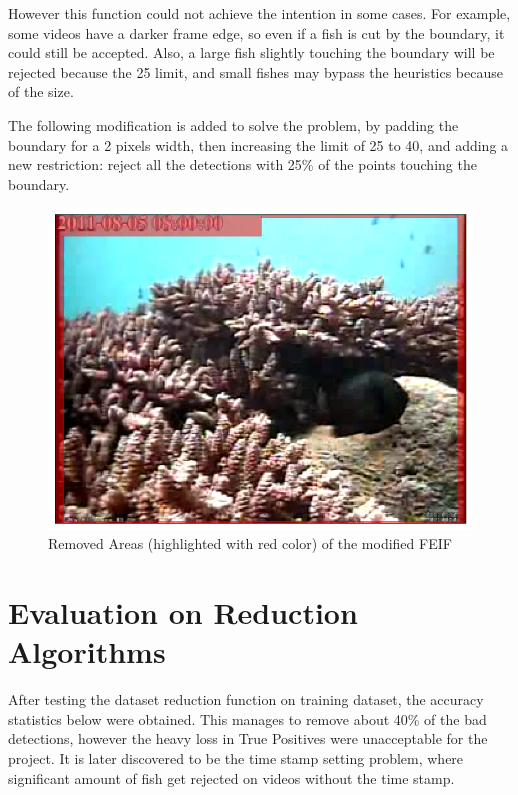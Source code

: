 \documentclass[bsc,logo,twoside,fullspacing,parskip]{infthesis}
\begin{document}
However this function could not achieve the intention in some cases. 
For example, some videos have a darker frame edge, so even if a fish is cut by the boundary, it could still be accepted. 
Also, a large fish slightly touching the boundary will be rejected because the 25 limit, and small fishes may bypass the heuristics because of the size.

The following modification is added to solve the problem, by padding the boundary for a 2 pixels width, then increasing the limit of 25 to 40, and adding a new restriction: reject all the detections with 25\% of the points touching the boundary. %

\begin{figure}[h]
\centering
    \includegraphics[scale=0.24]{graph/feifzone.png}
    \caption{Removed Areas (highlighted with red color) of the modified FEIF}
    \label{fig:feifzone}
\end{figure}

\section{Evaluation on Reduction Algorithms}
\label{sec:reduction}

After testing the dataset reduction function on training dataset, the accuracy statistics below were obtained. This manages to remove about 40\% of the bad detections, however the heavy loss in True Positives were unacceptable for the project. It is later discovered to be the time stamp setting problem, where significant amount of fish get rejected on videos without the time stamp.
\end{document}
